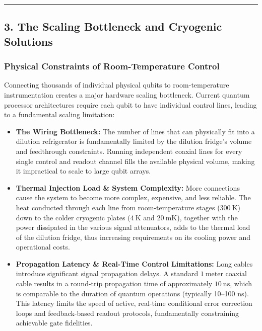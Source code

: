 \documentclass[
]{article}
\providecommand{\tightlist}{%
  \setlength{\itemsep}{0pt}\setlength{\parskip}{0pt}}
\begin{document}
\begin{center}\rule{0.5\linewidth}{0.5pt}\end{center}

\subsection{3. The Scaling Bottleneck and Cryogenic
Solutions}\label{the-scaling-bottleneck-and-cryogenic-solutions}

\subsubsection{Physical Constraints of Room-Temperature
Control}\label{physical-constraints-of-room-temperature-control}

Connecting thousands of individual physical qubits to room-temperature
instrumentation creates a major hardware scaling bottleneck. Current
quantum processor architectures require each qubit to have individual
control lines, leading to a fundamental scaling limitation:

\begin{itemize}
\tightlist
\item
  \textbf{The Wiring Bottleneck:} The number of lines that can
  physically fit into a dilution refrigerator is fundamentally limited
  by the dilution fridge's volume and feedthrough constraints. Running
  independent coaxial lines for every single control and readout channel
  fills the available physical volume, making it impractical to scale to
  large qubit arrays.
\item
  \textbf{Thermal Injection Load \& System Complexity:} More connections
  cause the system to become more complex, expensive, and less reliable.
  The heat conducted through each line from room-temperature stages
  (\(300\ \text{K}\)) down to the colder cryogenic plates
  (\(4\ \text{K}\) and \(20\ \text{mK}\)), together with the power
  dissipated in the various signal attenuators, adds to the thermal load
  of the dilution fridge, thus increasing requirements on its cooling
  power and operational costs.
\item
  \textbf{Propagation Latency \& Real-Time Control Limitations:} Long
  cables introduce significant signal propagation delays. A standard
  \(1\ \text{meter}\) coaxial cable results in a round-trip propagation
  time of approximately \(10\ \text{ns}\), which is comparable to the
  duration of quantum operations (typically 10--100 ns). This latency
  limits the speed of active, real-time conditional error correction
  loops and feedback-based readout protocols, fundamentally constraining
  achievable gate fidelities.
\end{itemize}
\end{document}
